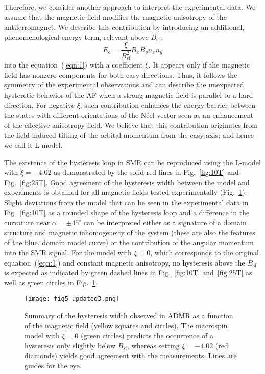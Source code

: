 \documentclass[%
 aps,
prl,
superscriptaddress,
 amsmath,amssymb,
reprint,%
]{revtex4-2}
\begin{document}
Therefore, we consider another approach to interpret the experimental data. We assume that the magnetic field modifies the magnetic anisotropy of the antiferromagnet. We describe this contribution by introducing an additional, phenomenological energy term, relevant above $B_\text{sf}$:
\begin{equation}\label{eq-ksi}
E_a=\frac{\xi}{B_\text{sf}^2} B_xB_yn_xn_y 
\end{equation}
into the equation~(\ref{eqn:1}) with a coefficient $\xi$. It appears only if the magnetic field has nonzero components for both easy directions. Thus, it follows the symmetry of the experimental observations and can describe the unexpected hysteretic behavior of the AF when a strong magnetic field is parallel to a hard direction. For negative $\xi$, such contribution enhances the energy barrier between the states with different orientations of the Néel vector seen as an enhancement of the effective anisotropy field. We believe that this contribution originates from the field-induced tilting of the orbital momentum from the easy axis; and hence we call it L-model.
 
The existence of the hysteresis loop in SMR can be reproduced using the L-model with $\xi=-4.02$ as demonstrated by the solid red lines in Fig.~\ref{fig:10T} and Fig.~\ref{fig:25T}. Good agreement of the hysteresis width between the model and experiments is obtained for all magnetic fields tested experimentally (Fig.~\ref{fig:hysts}). Slight deviations from the model that can be seen in the experimental data in Fig.~\ref{fig:10T} as a rounded shape of the hysteresis loop and a difference in the curvature near $\alpha = \pm 45^{\circ}$ can be interpreted either as a signature of a domain structure and magnetic inhomogeneity of the system (these are also the features of the blue, domain model curve) or the contribution of the angular momentum into the SMR signal.  For the model with $\xi =0$, which corresponds to the original equation~(\ref{eqn:1}) and constant magnetic anisotropy, no hysteresis above the $B_\text{sf}$ is expected as indicated by green dashed lines in Fig.~\ref{fig:10T} and~\ref{fig:25T} as well as green circles in Fig.~\ref{fig:hysts}.

\begin{figure}
\texttt{[image: fig5\_updated3.png]}
\caption{\label{fig:hysts}Summary of the hysteresis width observed in ADMR as a function of the magnetic field (yellow squares and circles). The macrospin model with $\xi=0$ (green circles) predicts the occurrence of a hysteresis only slightly below $B_\text{sf}$, whereas setting $\xi=-4.02$ (red diamonds) yields good agreement with the measurements. Lines are guides for the eye.}
\end{figure}
\end{document}
